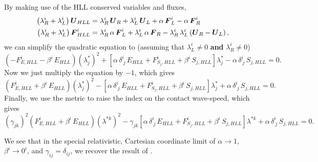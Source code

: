 \documentclass[10pt,preprint]{../aastex}
\begin{document}
By making use of the HLL conserved variables and fluxes,
\begin{align}
\left(\lambda^{i}_{R}+\lambda^{i}_{L}\right)\boldsymbol{U}_{HLL}&=\lambda^{i}_{R}\,\boldsymbol{U}_{R}+\lambda^{i}_{L}\,\boldsymbol{U}_{L}+\alpha\,\boldsymbol{F}^{i}_{L}-\alpha\,\boldsymbol{F}^{i}_{R}\\
\left(\lambda^{i}_{R}+\lambda^{i}_{L}\right)\boldsymbol{F}^{i}_{HLL}&=\lambda^{i}_{R}\,\alpha\,\boldsymbol{F}^{i}_{L}+\lambda^{i}_{L}\,\alpha\,\boldsymbol{F}_{R}-\lambda^{i}_{R}\,\lambda^{i}_{L}\left(\boldsymbol{U}_{R}-\boldsymbol{U}_{L}\right),
\end{align}
we can simplify the quadratic equation to (assuming that $\lambda^{i}_{L}\neq0$ \textbf{and} $\lambda^{i}_{R}\neq0$)
\begin{equation}
\left(-F^{i}_{E,HLL}-\beta^{i}\,E_{HLL}\right)\left(\lambda^{*}_{j}\right)^{2}+\left[\alpha\,\delta^{i}_{~j}\,E_{HLL}+F^{i}_{S_{j},HLL}+\beta^{i}\,S_{j,HLL}\right]\lambda^{*}_{j}-\alpha\,\delta^{i}_{~j}\,S_{j,HLL}=0.
\end{equation}
Now we just multiply the equation by $-1$, which gives
\begin{equation}
\left(F^{i}_{E,HLL}+\beta^{i}\,E_{HLL}\right)\left(\lambda^{*}_{j}\right)^{2}-\left[\alpha\,\delta^{i}_{~j}\,E_{HLL}+F^{i}_{S_{j},HLL}+\beta^{i}\,S_{j,HLL}\right]\lambda^{*}_{j}+\alpha\,\delta^{i}_{~j}\,S_{j,HLL}=0.
\end{equation}
Finally, we use the metric to raise the index on the contact wave-speed, which gives
\begin{equation}
\left(\gamma_{jk}\right)^{2}\left(F^{i}_{E,HLL}+\beta^{i}\,E_{HLL}\right)\left(\lambda^{*k}\right)^{2}-\gamma_{jk}\left[\alpha\,\delta^{i}_{~j}\,E_{HLL}+F^{i}_{S_{j},HLL}+\beta^{i}\,S_{j,HLL}\right]\lambda^{*k}+\alpha\,\delta^{i}_{~j}\,S_{j,HLL}=0.
\end{equation}

We see that in the special relativistic, Cartesian coordinate limit of $\alpha\rightarrow1$, $\beta^{i}\rightarrow0^{i}$, and $\gamma_{ij}=\delta_{ij}$, we recover the result of \citet{Mignone2005}.

\newpage


\end{document}
